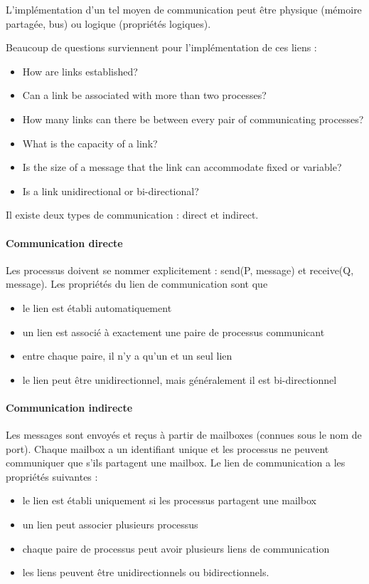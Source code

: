 	L'implémentation d'un tel moyen de communication peut être physique (mémoire partagée, bus) ou logique (propriétés logiques).
	
	Beaucoup de questions surviennent pour l'implémentation de ces liens :
	
	\begin{itemize}
		\item How are links established?
		\item Can a link be associated with more than two processes?
		\item How many links can there be between every pair of communicating processes?
		\item What is the capacity of a link?
		\item Is the size of a message that the link can accommodate fixed or variable?
		\item Is a link unidirectional or bi-directional?
	\end{itemize}

	Il existe deux types de communication : direct et indirect.
	
	\paragraph{Communication directe} Les processus doivent se nommer explicitement : send(P, message) et receive(Q, message). Les propriétés du lien de communication sont que
	
	\begin{itemize}
		\item le lien est établi automatiquement
		\item un lien est associé à exactement une paire de processus communicant
		\item entre chaque paire, il n'y a qu'un et un seul lien
		\item le lien peut être unidirectionnel, mais généralement il est bi-directionnel
	\end{itemize}
	
	\paragraph{Communication indirecte} Les messages sont envoyés et reçus à partir de mailboxes (connues sous le nom de port). Chaque mailbox a un identifiant unique et les processus ne peuvent communiquer que s'ils partagent une mailbox. Le lien de communication a les propriétés suivantes :
	
	\begin{itemize}
		\item le lien est établi uniquement si les processus partagent une mailbox
		\item un lien peut associer plusieurs processus
		\item chaque paire de processus peut avoir plusieurs liens de communication
		\item les liens peuvent être unidirectionnels ou bidirectionnels.
	\end{itemize}
	
